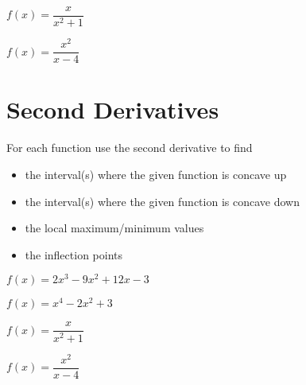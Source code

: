 \documentclass[10pt]{amsart}
\begin{document}
\vspace{3in}
\begin{multicols}{2}
  \begin{thm}
    \(f(x) = \dfrac{x}{x^2+1}\)
  \end{thm}

  \begin{thm}
    \(f(x) = \dfrac{x^2}{x - 4}\)
  \end{thm}
\end{multicols}

\newpage
\section*{Second Derivatives}
\noindent
For each function use the second derivative to find
\begin{itemize}
\item
  the interval(s) where the given function is concave up
\item
  the interval(s) where the given function is concave down
\item
  the local maximum/minimum values
\item
  the inflection points
\end{itemize}
\begin{multicols}{2}
  \begin{thm}
    \(f(x) = 2x^3 - 9x^2 + 12x - 3\)
  \end{thm}

  \begin{thm}
    \(f(x) = x^4 - 2x^2 + 3\)
  \end{thm}
\end{multicols}

\vspace{3in}
\begin{multicols}{2}
  \begin{thm}
    \(f(x) = \dfrac{x}{x^2+1}\)
  \end{thm}

  \begin{thm}
    \(f(x) = \dfrac{x^2}{x - 4}\)
  \end{thm}
\end{multicols}
\end{document}
